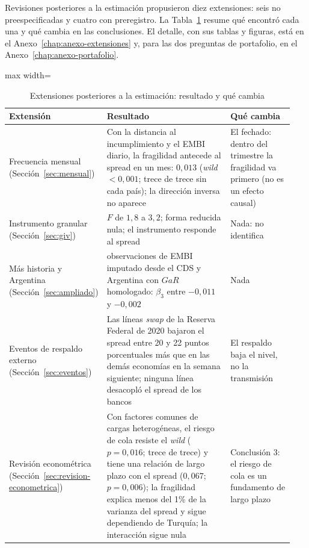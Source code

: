 Revisiones posteriores a la estimación propusieron diez extensiones: seis no preespecificadas y cuatro con preregistro. La Tabla~\ref{tab:extensiones-resumen} resume qué encontró cada una y qué cambia en las conclusiones. El detalle, con sus tablas y figuras, está en el Anexo~\ref{chap:anexo-extensiones} y, para las dos preguntas de portafolio, en el Anexo~\ref{chap:anexo-portafolio}.

\begin{table}[htbp]
\centering
\footnotesize
\caption[Extensiones posteriores a la estimación]{Extensiones posteriores a la estimación: resultado y qué cambia}
\label{tab:extensiones-resumen}
\begin{adjustbox}{max width=\linewidth}
\begin{tabular}{>{\raggedright\arraybackslash}p{0.24\linewidth}>{\raggedright\arraybackslash}p{0.47\linewidth}>{\raggedright\arraybackslash}p{0.23\linewidth}}
\toprule
Extensión & Resultado & Qué cambia \\
\midrule
Frecuencia mensual (Sección~\ref{sec:mensual}) & Con la distancia al incumplimiento y el EMBI diario, la fragilidad antecede al spread en un mes: $0{,}013$ (\textit{wild} $<0{,}001$; trece de trece sin cada país); la dirección inversa no aparece & El fechado: dentro del trimestre la fragilidad va primero (no es un efecto causal) \\
\addlinespace
Instrumento granular (Sección~\ref{sec:giv}) & $F$ de $1{,}8$ a $3{,}2$; forma reducida nula; el instrumento responde al spread & Nada: no identifica \\
\addlinespace
Más historia y Argentina (Sección~\ref{sec:ampliado}) & 189 observaciones de EMBI imputado desde el CDS y Argentina con $GaR$ homologado: $\beta_3$ entre $-0{,}011$ y $-0{,}002$ & Nada \\
\addlinespace
Eventos de respaldo externo (Sección~\ref{sec:eventos}) & Las líneas \textit{swap} de la Reserva Federal de 2020 bajaron el spread entre 20 y 22 puntos porcentuales más que en las demás economías en la semana siguiente; ninguna línea desacopló el spread de los bancos & El respaldo baja el nivel, no la transmisión \\
\addlinespace
Revisión econométrica (Sección~\ref{sec:revision-econometrica}) & Con factores comunes de cargas heterogéneas, el riesgo de cola resiste el \textit{wild} ($p=0{,}016$; trece de trece) y tiene una relación de largo plazo con el spread ($0{,}067$; $p=0{,}006$); la fragilidad explica menos del 1\% de la varianza del spread y sigue dependiendo de Turquía; la interacción sigue nula & Conclusión 3: el riesgo de cola es un fundamento de largo plazo \\

\end{tabular}
\end{adjustbox}
\end{table}
